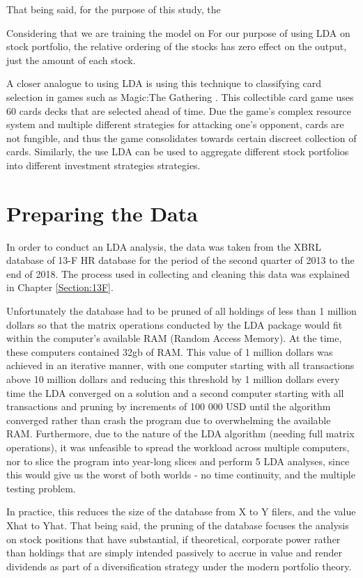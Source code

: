 That being said, for the purpose of this study, the 


Considering that we are training the model on  For our purpose of using LDA on stock portfolio, the relative ordering of the stocks has zero effect on the output, just the amount of each stock.  


A closer analogue to using LDA is using this technique to classifying card selection in games such as Magic:The Gathering \citep{Hlynsson2017}.  This collectible card game uses 60 cards decks that are selected ahead of time.  Due the game's complex resource system and multiple different strategies for attacking one's opponent, cards are not fungible, and thus the game consolidates towards certain discreet collection of cards.  Similarly, the use LDA can be used to aggregate different stock portfolios into different investment strategies strategies.  

\section{Preparing the Data}

In order to conduct an LDA analysis, the data was taken from the XBRL database of 13-F HR database for the period of the second quarter of 2013 to the end of 2018.  The process used in collecting and cleaning this data was explained in Chapter \ref{Section:13F}.  

Unfortunately the database had to be pruned of all holdings of less than 1 million dollars so that the matrix operations conducted by the LDA package would fit within the computer's available RAM (Random Access Memory).  At the time, these computers contained 32gb of RAM. This value of 1 million dollars was achieved in an iterative manner, with one computer starting with all transactions above 10 million dollars and reducing this threshold by 1 million dollars every time the LDA converged on a solution and a second computer starting with all transactions and pruning by increments of 100 000 USD until the algorithm converged rather than crash the program due to overwhelming the available RAM.  Furthermore, due to the nature of the LDA algorithm (needing full matrix operations), it was unfeasible to spread the workload across multiple computers, nor to slice the program into year-long slices and perform 5 LDA analyses, since this would give us the worst of both worlds - no time continuity, and the multiple testing problem. 

In practice, this reduces the size of the database from X to Y filers, and the value Xhat to Yhat.  That being said, the pruning of the database focuses the analysis on stock positions that have substantial, if theoretical, corporate power
rather than holdings that are simply intended passively to accrue in value and render dividends as part of a diversification strategy under the modern portfolio theory.

